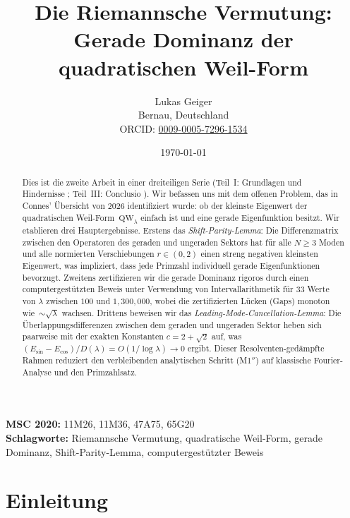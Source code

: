 \documentclass[12pt,a4paper]{article}
\title{Die Riemannsche Vermutung:\\ Gerade Dominanz der quadratischen Weil-Form}
\author{Lukas Geiger\\
\small Bernau, Deutschland\\
\small ORCID: \href{https://orcid.org/0009-0005-7296-1534}{0009-0005-7296-1534}}
\date{\today}
\theoremstyle{definition}
\theoremstyle{remark}
\begin{document}
\overfullrule=0pt
\maketitle

\begin{abstract}
Dies ist die zweite Arbeit in einer dreiteiligen Serie (Teil~I: Grundlagen und Hindernisse \cite{Geiger2026partI}; Teil~III: Conclusio \cite{Geiger2026partIII}). Wir befassen uns mit dem offenen Problem, das in Connes' \"Ubersicht von 2026 \cite{Connes2025} identifiziert wurde: ob der kleinste Eigenwert der quadratischen Weil-Form~$\mathrm{QW}_\lambda$ einfach ist und eine gerade Eigenfunktion besitzt. Wir etablieren drei Hauptergebnisse. Erstens das \emph{Shift-Parity-Lemma}: Die Differenzmatrix zwischen den Operatoren des geraden und ungeraden Sektors hat f\"ur alle $N \geq 3$ Moden und alle normierten Verschiebungen $r \in (0,2)$ einen streng negativen kleinsten Eigenwert, was impliziert, dass jede Primzahl individuell gerade Eigenfunktionen bevorzugt. Zweitens zertifizieren wir die gerade Dominanz rigoros durch einen computergest\"utzten Beweis unter Verwendung von Intervallarithmetik f\"ur $33$ Werte von $\lambda$ zwischen $100$ und $1{,}300{,}000$, wobei die zertifizierten L\"ucken (Gaps) monoton wie~$\sim\!\sqrt{\lambda}$ wachsen. Drittens beweisen wir das \emph{Leading-Mode-Cancellation-Lemma}: Die \"Uberlappungsdifferenzen zwischen dem geraden und ungeraden Sektor heben sich paarweise mit der exakten Konstanten $c = 2 + \sqrt{2}$ auf, was $(E_{\sin} - E_{\cos})/D(\lambda) = O(1/\log\lambda) \to 0$ ergibt. Dieser Resolventen-ged\"ampfte Rahmen reduziert den verbleibenden analytischen Schritt (M1$''$) auf klassische Fourier-Analyse und den Primzahlsatz.
\end{abstract}

\noindent\textbf{MSC 2020:} 11M26, 11M36, 47A75, 65G20\\
\textbf{Schlagworte:} Riemannsche Vermutung, quadratische Weil-Form, gerade Dominanz, Shift-Parity-Lemma, computergest\"utzter Beweis

\newpage
\tableofcontents
\newpage

\section{Einleitung}
\label{sec:intro}
\end{document}
